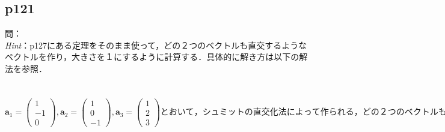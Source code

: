 \documentclass[dvipdfmx,uplatex,11pt]{jsarticle}
\theoremstyle{definition}
\begin{document}
\subsection{p121}
問：\\
\textsl{Hint}：p127にある定理をそのまま使って，どの２つのベクトルも直交するようなベクトルを作り，大きさを１にするように計算する．具体的に解き方は以下の解法を参照．\\
\dotfill \\ \\
$\bm{a}_1=
\begin{pmatrix}
1 \\
-1 \\
0
\end{pmatrix}
,\bm{a}_2=
\begin{pmatrix}
1 \\
0 \\
-1
\end{pmatrix}
,\bm{a}_3=
\begin{pmatrix}
1 \\
2 \\
3
\end{pmatrix}
とおいて，シュミットの直交化法によって作られる，どの２つのベクトルも直交するようなベクトルを\bm{b}_1, \bm{b}_2, \bm{b}_3 ，正規直交基底を\bm{c}_1, \bm{c}_2, \bm{c}_3 とする．$
\end{document}
